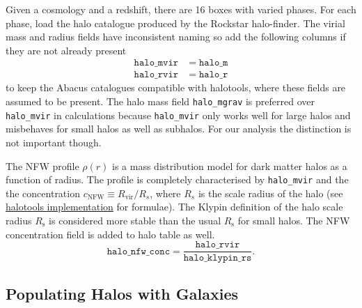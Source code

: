 \documentclass[fleqn,usenatbib]{mnras}
\begin{document}
		Given a cosmology and a redshift, there are 16 boxes with varied phases. For each phase, load the halo catalogue produced by the Rockstar halo-finder. The virial mass and radius fields have inconsistent naming so add the following columns if they are not already present
		\begin{align}
			\mathtt{halo\_mvir} & = \mathtt{halo\_m} \\
			\mathtt{halo\_rvir} & = \mathtt{halo\_r}
		\end{align}
		to keep the Abacus catalogues compatible with halotools, where these fields are assumed to be present. The halo mass field \texttt{halo\_mgrav} is preferred over \texttt{halo\_mvir} in calculations because \texttt{halo\_mvir} only works well for large halos and misbehaves for small halos as well as subhalos. For our analysis the distinction is not important though. 
		
		The NFW profile $\rho(r)$ is a mass distribution model for dark matter halos as a function of radius. The profile is completely characterised by \texttt{halo\_mvir} and the the concentration $c_\text{NFW} \equiv R_\text{vir}/{R_s}$, where $R_s$ is the scale radius of the halo (see \href{http://halotools.readthedocs.io/en/latest/source_notes/empirical_models/phase_space_models/nfw_profile_source_notes.html#nfw-profile-tutorial}{halotools implementation} for formulae). The Klypin definition of the halo scale radius $R_\text{s}$ is considered more stable than the usual $R_\text{s}$ for small halos. The NFW concentration field is added to halo table as well.
		\begin{equation}
			\mathtt{halo\_nfw\_conc} = \frac{\mathtt{halo\_rvir}}{\mathtt{halo\_klypin\_rs}}.
		\end{equation}
		
	\subsection{Populating Halos with Galaxies}
		
\end{document}
